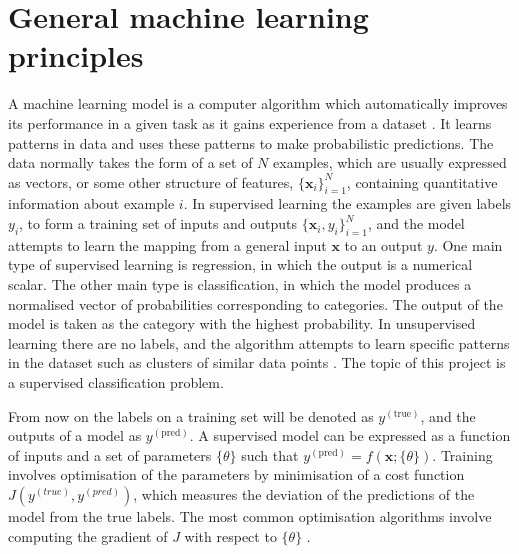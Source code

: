 \documentclass[12pt]{article}
\begin{document}
\section{General machine learning principles}
A machine learning model is a computer algorithm which automatically improves its performance in a given task as it gains experience from a dataset \cite{Goodfellow16}. It learns patterns in data and uses these patterns to make probabilistic predictions. The data normally takes the form of a set of $N$ examples, which are usually expressed as vectors, or some other structure of features, $\{\mathbf{x}_i\}_{i=1}^N$, containing quantitative information about example $i$. In supervised learning the examples are given labels $y_i$, to form a training set of inputs and outputs $\{\mathbf{x}_i, y_i\}_{i=1}^N$, and the model attempts to learn the mapping from a general input $\mathbf{x}$ to an output $y$. One main type of supervised learning is regression, in which the output is a numerical scalar. The other main type is classification, in which the model produces a normalised vector of probabilities corresponding to categories. The output of the model is taken as the category with the highest probability. In unsupervised learning there are no labels, and the algorithm attempts to learn specific patterns in the dataset such as clusters of similar data points \cite{Murphy12}. The topic of this project is a supervised classification problem.

From now on the labels on a training set will be denoted as $y^{(\textrm{true})}$, and the outputs of a model as $y^{(\textrm{pred})}$. A supervised model can be expressed as a function of inputs and a set of parameters $\{\theta\}$ such that $y^{(\textrm{pred})}=f(\mathbf{x};\{\theta\})$. Training involves optimisation of the parameters by minimisation of a cost function $J(y^{(true)},y^{(pred)})$, which measures the deviation of the predictions of the model from the true labels. The most common optimisation algorithms involve computing the gradient of $J$ with respect to $\{\theta\}$ \cite{Goodfellow16}. 
\end{document}
